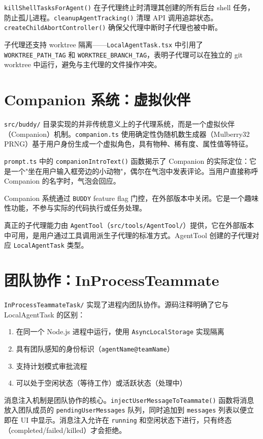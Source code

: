\texttt{killShellTasksForAgent()} 在子代理终止时清理其创建的所有后台 shell 任务，防止孤儿进程。\texttt{cleanupAgentTracking()} 清理 API 调用追踪状态。\texttt{createChildAbortController()} 确保父代理中断时子代理也被中断。

子代理还支持 worktree 隔离——\texttt{LocalAgentTask.tsx} 中引用了 \texttt{WORKTREE\_PATH\_TAG} 和 \texttt{WORKTREE\_BRANCH\_TAG}，表明子代理可以在独立的 git worktree 中运行，避免与主代理的文件操作冲突。

\section{Companion 系统：虚拟伙伴}

\texttt{src/buddy/} 目录实现的并非传统意义上的子代理系统，而是一个虚拟伙伴（Companion）机制。\texttt{companion.ts} 使用确定性伪随机数生成器（Mulberry32 PRNG）基于用户身份生成一个虚拟角色，具有物种、稀有度、属性值等特征。

\texttt{prompt.ts} 中的 \texttt{companionIntroText()} 函数揭示了 Companion 的实际定位：它是一个"坐在用户输入框旁边的小动物"，偶尔在气泡中发表评论。当用户直接称呼 Companion 的名字时，气泡会回应。

Companion 系统通过 \texttt{BUDDY} feature flag 门控，在外部版本中关闭。它是一个趣味性功能，不参与实际的代码执行或任务处理。

真正的子代理能力由 \texttt{AgentTool}（\texttt{src/tools/AgentTool/}）提供，它在外部版本中可用，是用户通过工具调用派生子代理的标准方式。AgentTool 创建的子代理对应 \texttt{LocalAgentTask} 类型。

\section{团队协作：InProcessTeammate}

\texttt{InProcessTeammateTask/} 实现了进程内团队协作。源码注释明确了它与 LocalAgentTask 的区别：

\begin{enumerate}
  \item 在同一个 Node.js 进程中运行，使用 \texttt{AsyncLocalStorage} 实现隔离
  \item 具有团队感知的身份标识（\texttt{agentName@teamName}）
  \item 支持计划模式审批流程
  \item 可以处于空闲状态（等待工作）或活跃状态（处理中）
\end{enumerate}

消息注入机制是团队协作的核心。\texttt{injectUserMessageToTeammate()} 函数将消息放入团队成员的 \texttt{pendingUserMessages} 队列，同时追加到 \texttt{messages} 列表以便立即在 UI 中显示。消息注入允许在 \texttt{running} 和空闲状态下进行，只有终态（completed/failed/killed）才会拒绝。

